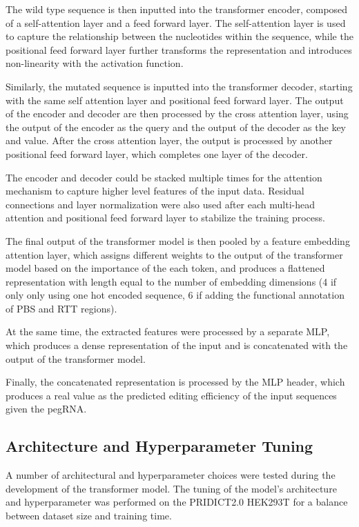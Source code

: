 The wild type sequence is then inputted into the transformer encoder, composed of a self-attention layer and a feed forward layer. The self-attention layer is used to capture the relationship between the nucleotides within the sequence, while the positional feed forward layer further transforms the representation and introduces non-linearity with the activation function. 

Similarly, the mutated sequence is inputted into the transformer decoder, starting with the same self attention layer and positional feed forward layer. The output of the encoder and decoder are then processed by the cross attention layer, using the output of the encoder as the query and the output of the decoder as the key and value. After the cross attention layer, the output is processed by another positional feed forward layer, which completes one layer of the decoder. 

The encoder and decoder could be stacked multiple times for the attention mechanism to capture higher level features of the input data. Residual connections and layer normalization were also used after each multi-head attention and positional feed forward layer to stabilize the training process.

The final output of the transformer model is then pooled by a feature embedding attention layer, which assigns different weights to the output of the transformer model based on the importance of the each token, and produces a flattened representation with length equal to the number of embedding dimensions (4 if only only using one hot encoded sequence, 6 if adding the functional annotation of PBS and RTT regions).

At the same time, the extracted features were processed by a separate MLP, which produces a dense representation of the input and is concatenated with the output of the transformer model. 

Finally, the concatenated representation is processed by the MLP header, which produces a real value as the predicted editing efficiency of the input sequences given the pegRNA.



\subsection{Architecture and Hyperparameter Tuning}

A number of architectural and hyperparameter choices were tested during the development of the transformer model.
The tuning of the model's architecture and hyperparameter was performed on the PRIDICT2.0 HEK293T for a balance between dataset size and training time.

